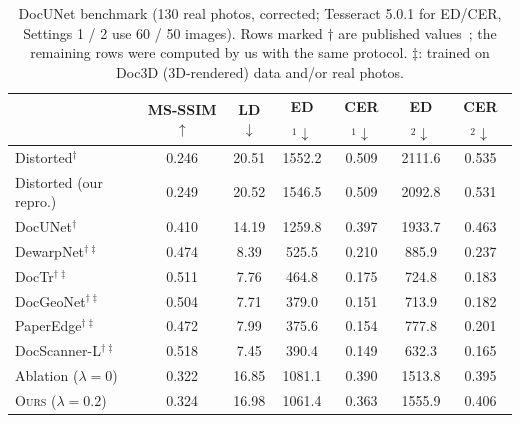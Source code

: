 \documentclass[conference]{IEEEtran}
\newcommand{\ours}{\textsc{Ours}}
\begin{document}
\begin{table}[t]
\centering
\caption{DocUNet benchmark (130 real photos, corrected; Tesseract 5.0.1 for ED/CER, Settings 1 / 2 use 60 / 50 images). Rows marked $\dagger$ are published values~\cite{feng2022docgeonet,feng2025docscanner}; the remaining rows were computed by us with the same protocol. $\ddagger$: trained on Doc3D (3D-rendered) data and/or real photos.}
\label{tab:docunet}
\footnotesize\setlength{\tabcolsep}{1.8pt}
\begin{tabular}{@{}lcccccc@{}}
\toprule
 & MS-SSIM$\uparrow$ & LD$\downarrow$ & ED$_1\downarrow$ & CER$_1\downarrow$ & ED$_2\downarrow$ & CER$_2\downarrow$ \\
\midrule
Distorted$^\dagger$ & 0.246 & 20.51 & 1552.2 & 0.509 & 2111.6 & 0.535 \\
Distorted (our repro.) & 0.249 & 20.52 & 1546.5 & 0.509 & 2092.8 & 0.531 \\
\midrule
DocUNet$^\dagger$~\cite{ma2018docunet} & 0.410 & 14.19 & 1259.8 & 0.397 & 1933.7 & 0.463 \\
DewarpNet$^{\dagger\ddagger}$~\cite{das2019dewarpnet} & 0.474 & 8.39 & 525.5 & 0.210 & 885.9 & 0.237 \\
DocTr$^{\dagger\ddagger}$~\cite{feng2021doctr} & 0.511 & 7.76 & 464.8 & 0.175 & 724.8 & 0.183 \\
DocGeoNet$^{\dagger\ddagger}$~\cite{feng2022docgeonet} & 0.504 & 7.71 & 379.0 & 0.151 & 713.9 & 0.182 \\
PaperEdge$^{\dagger\ddagger}$~\cite{ma2022paperedge} & 0.472 & 7.99 & 375.6 & 0.154 & 777.8 & 0.201 \\
DocScanner-L$^{\dagger\ddagger}$~\cite{feng2025docscanner} & 0.518 & 7.45 & 390.4 & 0.149 & 632.3 & 0.165 \\
\midrule
Ablation ($\lambda=0$) & 0.322 & 16.85 & 1081.1 & 0.390 & 1513.8 & 0.395 \\
\ours{} ($\lambda=0.2$) & 0.324 & 16.98 & 1061.4 & 0.363 & 1555.9 & 0.406 \\
\bottomrule
\end{tabular}
\end{table}
\end{document}
